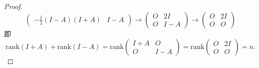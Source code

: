\documentclass{article}
\begin{document}
\begin{enumerate}
\begin{proof}
\[\begin{pmatrix}
                    -\frac{1}{2}(I-A)(I+A) & I-A
                \end{pmatrix}
                \longrightarrow
                \begin{pmatrix}
                    O & 2I\\
                    O & I-A
                \end{pmatrix}
                \longrightarrow
                \begin{pmatrix}
                    O & 2I\\
                    O & O
                \end{pmatrix}
            \]
            即
            \[
                \mbox{rank}(I+A)+\mbox{rank}(I-A)=
                \mbox{rank}\begin{pmatrix}
                    I+A & O\\
                    O & I-A
                \end{pmatrix}=
                \mbox{rank}\begin{pmatrix}
                    O & 2I\\
                    O & O
                \end{pmatrix}
                =n.
            \]
        \end{proof}
    \end{enumerate}
\end{document}

